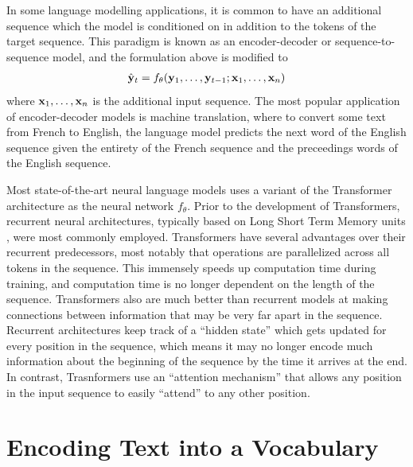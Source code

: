 In some language modelling applications, it is common to have an additional sequence which the model is conditioned on in addition to the tokens of the target sequence.
This paradigm is known as an encoder-decoder or sequence-to-sequence model, and the formulation above is modified to
\begin{align}
    \hat{\mathbf{y}}_t = f_\theta(\mathbf{y}_1, \ldots, \mathbf{y}_{t-1}; \mathbf{x}_1, \ldots, \mathbf{x}_n)
    \label{eq:cond_lm_feq}
\end{align}
where $\mathbf{x}_1, \ldots, \mathbf{x}_n$ is the additional input sequence. 
The most popular application of encoder-decoder models is machine translation, where to convert some text from French to English, the language model predicts the next word of the English sequence given the entirety of the French sequence and the preceedings words of the English sequence.

Most state-of-the-art neural language models uses a variant of the Transformer architecture \cite{vaswani2017attention} as the neural network $f_\theta$.
Prior to the development of Transformers, recurrent neural architectures, typically based on Long Short Term Memory units \citep{hochreiter1997long}, were most commonly employed.
Transformers have several advantages over their recurrent predecessors, most notably that operations are parallelized across all tokens in the sequence.
This immensely speeds up computation time during training, and computation time is no longer dependent on the length of the sequence.
Transformers also are much better than recurrent models at making connections between information that may be very far apart in the sequence.
Recurrent architectures keep track of a ``hidden state'' which gets updated for every position in the sequence, which means it may no longer encode much information about the beginning of the sequence by the time it arrives at the end.
In contrast, Trasnformers use an ``attention mechanism'' that allows any position in the input sequence to easily ``attend'' to any other position.


\section{Encoding Text into a Vocabulary}

